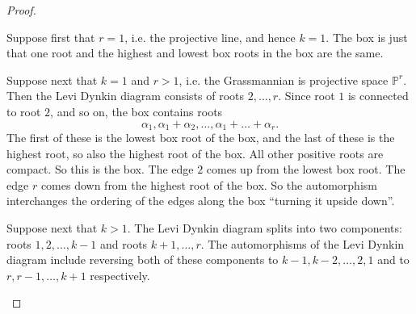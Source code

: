 \documentclass[a4paper,10pt]{amsart}
\theoremstyle{remark}
\renewcommand*{\aa}{\alpha}
\begin{document}
\begin{proof}
\begin{itemize}
Suppose first that \(r=1\), i.e.{} the projective line, and hence \(k=1\).
The box is just that one root and the highest and lowest box roots in the box are the same.

Suppose next that \(k=1\) and \(r>1\), i.e.{} the Grassmannian is projective space \(\mathbb{P}^r\).
Then the Levi Dynkin diagram consists of roots \(2,\dots,r\).
Since root \(1\) is connected to root \(2\), and so on, the box contains roots
\[
\aa_1,\aa_1+\aa_2,\dots,\aa_1+\dots+\aa_r.
\]
The first of these is the lowest box root of the box, and the last of these is the highest root, so also the highest root of the box.
All other positive roots are compact.
So this is the box.
The edge \(2\) comes up from the lowest box root.
The edge \(r\) comes down from the highest root of the box.
So the automorphism interchanges the ordering of the edges along the box ``turning it upside down''.

Suppose next that \(k>1\).
The Levi Dynkin diagram splits into two components: roots \(1,2,\dots,k-1\) and roots \(k+1,\dots,r\).
The automorphisms of the Levi Dynkin diagram include reversing both of these components to \(k-1,k-2,\dots,2,1\) and to \(r,r-1,\dots,k+1\) respectively.


\end{itemize}
\end{proof}
\end{document}
